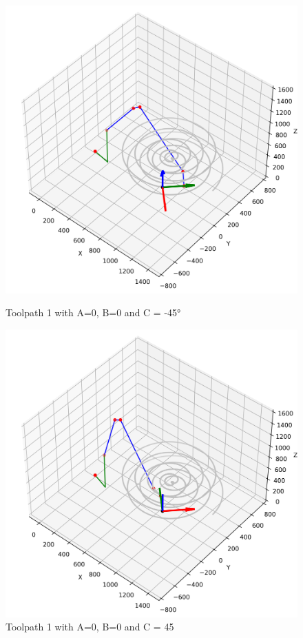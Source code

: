 \begin{figure}[H]
	\centering
	\begin{minipage}{0.5\textwidth}
		\includegraphics[width=\textwidth]{figures/robotANDpath1_-45.png}
		\caption{Toolpath 1 with A=0, B=0 and C = -45°}
		\label{TP1-25}
	\end{minipage}\hfill
	\begin{minipage}{0.5\textwidth}
		\includegraphics[width=\textwidth]{figures/robotANDpath1_45.png}
		\caption{Toolpath 1 with A=0, B=0 and C = 45}
		\label{TP1+25}
	\end{minipage}\par
\end{figure}

